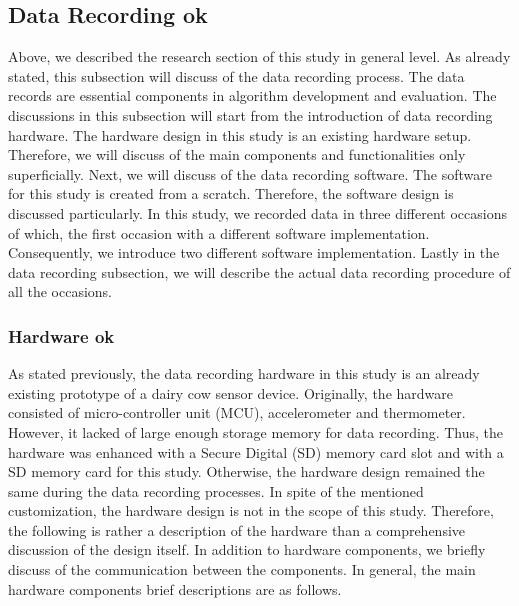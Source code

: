 \documentclass[english,12pt,a4paper,pdftex,elec,utf8]{aaltothesis}
\begin{document}
\subsection{Data Recording ok} \label{datarecordingsection}

Above, we described the research section of this study in general level. As already stated, this subsection will discuss of the data recording process. The data records are essential components in algorithm development and evaluation. The discussions in this subsection will start from the introduction of data recording hardware. The hardware design in this study is an existing hardware setup. Therefore, we will discuss of the main components and functionalities only superficially. Next, we will discuss of the data recording software. The software for this study is created from a scratch. Therefore, the software design is discussed particularly. In this study, we recorded data in three different occasions of which, the first occasion with a different software implementation. Consequently, we introduce two different software implementation.  Lastly in the data recording subsection, we will describe the actual data recording procedure of all the occasions.


\subsubsection{Hardware ok} \label{hardwaresection}

As stated previously, the data recording hardware in this study is an already existing prototype of a dairy cow sensor device. Originally, the hardware consisted of micro-controller unit (MCU), accelerometer and thermometer. However, it lacked of large enough storage memory for data recording. Thus, the hardware was enhanced with a Secure Digital (SD) memory card slot and with a SD memory card for this study. Otherwise, the hardware design remained the same during the data recording processes. In spite of the mentioned customization, the hardware design is not in the scope of this study. Therefore, the following is rather a description of the hardware than a comprehensive discussion of the design itself. In addition to hardware components, we briefly discuss of the communication between the components. In general, the main hardware components brief descriptions are as follows.
\end{document}
